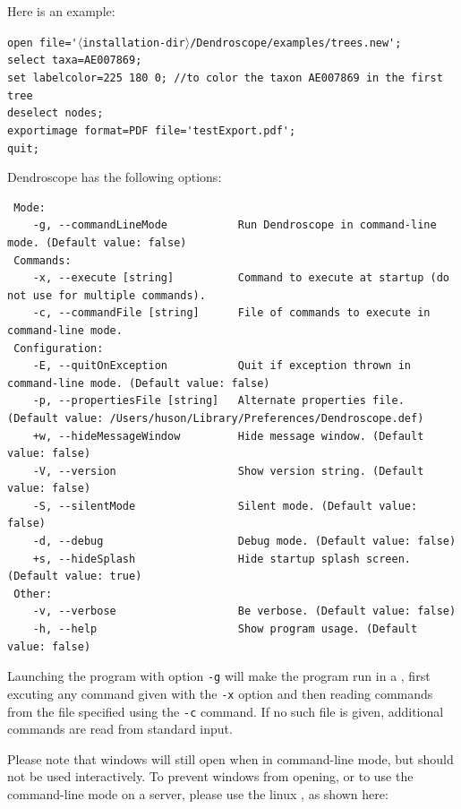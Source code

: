 \documentclass[11pt]{article}
\def\Dendroscope{{\sf Dendroscope }}
\begin{document}
Here is an example:

\verb"open file='"$\langle$\verb"installation-dir"$\rangle$\verb"/Dendroscope/examples/trees.new';"\\
\verb"select taxa=AE007869;"\\
\verb"set labelcolor=225 180 0; //to color the taxon AE007869 in the first tree"\\
\verb"deselect nodes;"\\
\verb"exportimage format=PDF file='testExport.pdf';"\\
\verb"quit;"


\Dendroscope has the following  options:

\begin{verbatim}
 Mode:
	-g, --commandLineMode           Run Dendroscope in command-line mode. (Default value: false)
 Commands:
	-x, --execute [string]          Command to execute at startup (do not use for multiple commands). 
	-c, --commandFile [string]      File of commands to execute in command-line mode. 
 Configuration:
	-E, --quitOnException           Quit if exception thrown in command-line mode. (Default value: false)
	-p, --propertiesFile [string]   Alternate properties file. (Default value: /Users/huson/Library/Preferences/Dendroscope.def)
	+w, --hideMessageWindow         Hide message window. (Default value: false)
	-V, --version                   Show version string. (Default value: false)
	-S, --silentMode                Silent mode. (Default value: false)
	-d, --debug                     Debug mode. (Default value: false)
	+s, --hideSplash                Hide startup splash screen. (Default value: true)
 Other:
	-v, --verbose                   Be verbose. (Default value: false)
	-h, --help                      Show program usage. (Default value: false)
\end{verbatim}

Launching the program with option {\tt -g} will make the program run
in a , first excuting any
command given with the {\tt -x} option and then reading
commands from the file specified using the {\tt -c} command.
If no such file is given, additional commands are read from standard input.

Please note that windows will still open when in command-line mode, but should not be used interactively.
To prevent windows from opening, or to use the command-line mode on a server, please use the linux ,
as shown here:
\end{document}
